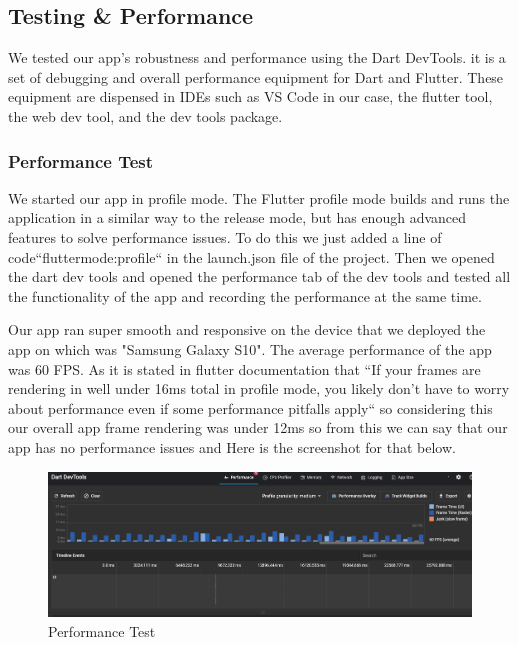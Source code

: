 \subsection{Testing \& Performance}
We tested our app's robustness and performance using the Dart DevTools. it is a set of debugging and overall performance equipment for Dart and Flutter. These equipment are dispensed in IDEs such as VS Code in our case, the flutter tool, the web dev tool, and the dev tools package.

\subsubsection{Performance Test}
We started our app in profile mode. The Flutter profile mode builds and runs the application in a similar way to the release mode, but has enough advanced features to solve performance issues. To do this we just added a line of code``fluttermode:profile`` in the launch.json file of the project. Then we opened the dart dev tools and opened the performance tab of the dev tools and tested all the functionality of the app and recording the performance at the same time. 

Our app ran super smooth and responsive on the device that we deployed the app on which was "Samsung Galaxy S10". The average performance of the app was 60 FPS. As it is stated in flutter documentation \cite{PerformanceDocs:online} that ``If your frames are rendering in well under 16ms total in profile mode, you likely don’t have to worry about performance even if some performance pitfalls apply`` so considering this our overall app frame rendering was under 12ms so from this we can say that our app has no performance issues and Here is the screenshot for that below.

\begin{figure}[!htb]
    \centering
    \includegraphics[scale=0.35]{img/performance test.PNG}
    \caption{Performance Test}
    \label{fig:Performance Test}
\end{figure}

